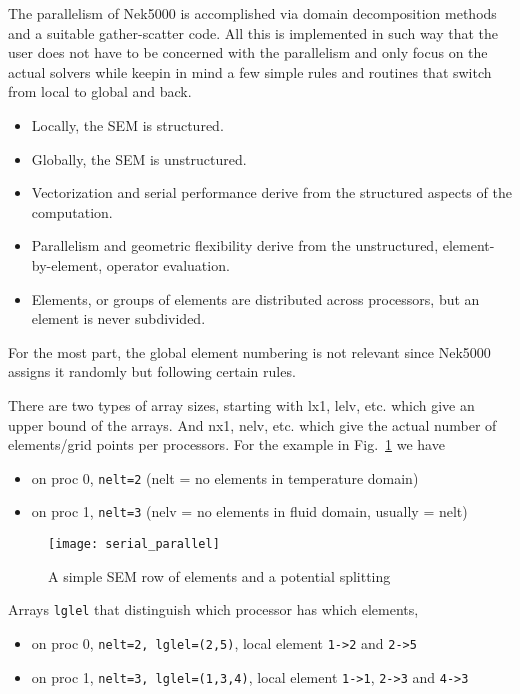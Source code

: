 


The parallelism of Nek5000 is accomplished via domain decomposition methods and a suitable gather-scatter code. All this is implemented in such way that the user does not have to be concerned with the parallelism and only focus on the actual solvers while keepin in mind a few simple rules and routines that switch from local to global and back.
\begin{itemize}
\item Locally, the SEM is structured.

\item Globally, the SEM is unstructured.

\item Vectorization and serial performance derive from the structured aspects of the computation.

\item Parallelism and geometric flexibility derive from the unstructured, element-by-element, operator evaluation.

\item Elements, or groups of elements are distributed across processors, but an element is never subdivided.
\end{itemize}

For the most part, the global element numbering is not relevant since Nek5000 assigns it randomly but following certain rules. 

There are two types of array sizes, starting with {\color{red}l}x1, {\color{red}l}elv, etc. which give an upper bound of the arrays. And {\color{red}n}x1, {\color{red}n}elv, etc. which give the actual number of elements/grid points per processors. For the example in Fig.~\ref{fig:procsplit} we have 
\begin{itemize}
\item on proc 0, {\tt nelt=2}  (nelt = no elements in temperature domain)
\item on proc 1, {\tt nelt=3}  (nelv = no elements in fluid domain, usually = nelt)
\end{itemize}

\begin{figure}
\centering
\texttt{[image: serial\_parallel]}
\caption{A simple SEM row of elements and a potential splitting}
\label{fig:procsplit}
\end{figure}
Arrays {\tt lglel} that distinguish which processor has which elements, 

\begin{itemize}
\item on proc 0, {\tt nelt=2, lglel=(2,5)}, local element {\tt 1->2} and {\tt 2->5}
\item on proc 1, {\tt nelt=3, lglel=(1,3,4)}, local element {\tt 1->1}, {\tt 2->3} and {\tt 4->3}
\end{itemize}
		  
